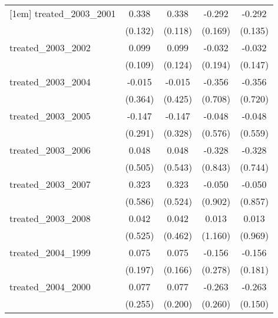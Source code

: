 {\begin{tabular}{l*{4}{c}}
[1em]
treated\_2003\_2001&       0.338\sym{*}  &       0.338\sym{**} &      -0.292         &      -0.292\sym{*}  \\
            &     (0.132)         &     (0.118)         &     (0.169)         &     (0.135)         \\
[1em]
treated\_2003\_2002&       0.099         &       0.099         &      -0.032         &      -0.032         \\
            &     (0.109)         &     (0.124)         &     (0.194)         &     (0.147)         \\
[1em]
treated\_2003\_2004&      -0.015         &      -0.015         &      -0.356         &      -0.356         \\
            &     (0.364)         &     (0.425)         &     (0.708)         &     (0.720)         \\
[1em]
treated\_2003\_2005&      -0.147         &      -0.147         &      -0.048         &      -0.048         \\
            &     (0.291)         &     (0.328)         &     (0.576)         &     (0.559)         \\
[1em]
treated\_2003\_2006&       0.048         &       0.048         &      -0.328         &      -0.328         \\
            &     (0.505)         &     (0.543)         &     (0.843)         &     (0.744)         \\
[1em]
treated\_2003\_2007&       0.323         &       0.323         &      -0.050         &      -0.050         \\
            &     (0.586)         &     (0.524)         &     (0.902)         &     (0.857)         \\
[1em]
treated\_2003\_2008&       0.042         &       0.042         &       0.013         &       0.013         \\
            &     (0.525)         &     (0.462)         &     (1.160)         &     (0.969)         \\
[1em]
treated\_2004\_1999&       0.075         &       0.075         &      -0.156         &      -0.156         \\
            &     (0.197)         &     (0.166)         &     (0.278)         &     (0.181)         \\
[1em]
treated\_2004\_2000&       0.077         &       0.077         &      -0.263         &      -0.263         \\
            &     (0.255)         &     (0.200)         &     (0.260)         &     (0.150)         \\

\end{tabular}}
